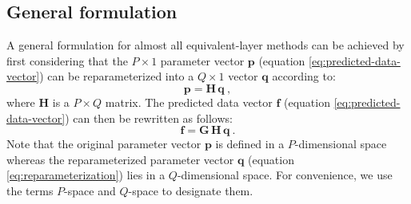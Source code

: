 \subsection{General formulation}
\label{subsec:general-formulation}

A general formulation for almost all equivalent-layer methods can be achieved by first considering 
that the $P \times 1$ parameter vector $\mathbf{p}$ (equation \ref{eq:predicted-data-vector}) can be reparameterized 
into a $Q \times 1$ vector $\mathbf{q}$ according to:
\begin{equation}
	\mathbf{p} = \mathbf{H} \, \mathbf{q} \: ,
	\label{eq:reparameterization}
\end{equation}
where $\mathbf{H}$ is a $P \times Q$ matrix.
The predicted data vector $\mathbf{f}$ (equation \ref{eq:predicted-data-vector}) can then be
rewritten as follows:
\begin{equation}
	\mathbf{f} = \mathbf{G} \, \mathbf{H} \, \mathbf{q} \: .
	\label{eq:predicted-data-vetor-reparameterized}
\end{equation}
Note that the original parameter vector $\mathbf{p}$ is defined in a $P$-dimensional space whereas the reparameterized
parameter vector $\mathbf{q}$ (equation \ref{eq:reparameterization}) lies in a $Q$-dimensional space.
For convenience, we use the terms $P$-space and $Q$-space to designate them.

